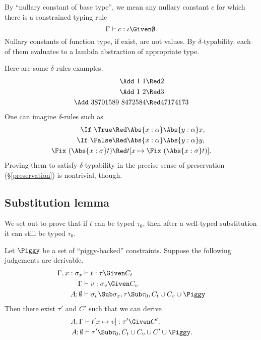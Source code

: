 \documentclass{amsart}
\theoremstyle{definition}
\begin{document}
By ``nullary constant of base type'', we mean any nullary
constant $c$ for which there is a constrained typing rule
\[
\Gamma\vdash c:\iota\Given\emptyset.
\]
Nullary constants of function type, if exist, are not values. By
$\delta$-typability, each of them evaluates to a lambda
abstraction of appropriate type.

Here are some $\delta$-rules examples.
\begin{align*}
\Add~1~1&\Red2\\
\Add~1~2&\Red3\\
\Add~38701589~8472584&\Red47174173
\end{align*}
One can imagine $\delta$-rules such as
\begin{align*}
\If~\True &\Red\Abs{x:\alpha}\Abs{y:\alpha}x,\\
\If~\False&\Red\Abs{x:\alpha}\Abs{y:\alpha}y,\\
\Fix~(\Abs{x:\sigma} t)&\Red t[x\mapsto \Fix~(\Abs{x:\sigma} t)].
\end{align*}
Proving them to satisfy $\delta$-typability in the precise sense
of preservation (\S\ref{preservation}) is nontrivial, though.

\subsection{Substitution lemma}
\label{sublem}
We set out to prove that if $t$ can be typed $\tau_0$, then after
a well-typed substitution it can still be typed $\tau_0$.

Let $\Piggy$ be a set of ``piggy-backed'' constraints. Suppose
the following judgements are derivable.
\begin{align}
\Gamma,x:\sigma_x&\vdash t:\tau\Given C_t \notag
\\
\Gamma&\vdash v:\sigma_v \Given C_v \notag
\\
A;\emptyset&\vdash
\sigma_v\Sub\sigma_x, \tau\Sub\tau_0,C_t\cup C_v\cup\Piggy
\label{eq:subass}
\end{align}
Then there exist $\tau'$ and $C'$ such that we can derive
\begin{align*}
A;\Gamma&\vdash t[x\mapsto v] : \tau'\Given C',\\
A;\emptyset &\vdash \tau'\Sub\tau_0, C_t\cup C_v\cup C'\cup\Piggy.
\end{align*}
\end{document}
